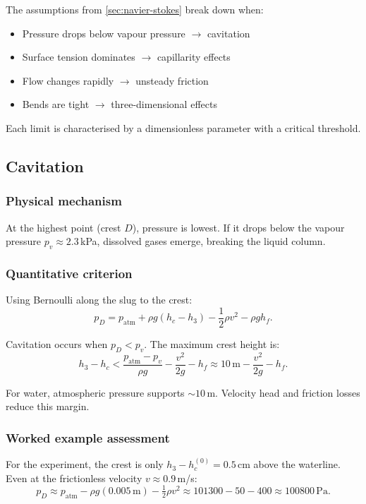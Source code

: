 \documentclass[11pt]{article}
\begin{document}
The assumptions from \cref{sec:navier-stokes} break down when:
\begin{itemize}[nosep,leftmargin=2em]
  \item Pressure drops below vapour pressure $\to$ cavitation
  \item Surface tension dominates $\to$ capillarity effects
  \item Flow changes rapidly $\to$ unsteady friction
  \item Bends are tight $\to$ three-dimensional effects
\end{itemize}

Each limit is characterised by a dimensionless parameter with a critical threshold.

\subsection{Cavitation}

\subsubsection{Physical mechanism}

At the highest point (crest $D$), pressure is lowest. If it drops below the vapour pressure $p_v \approx 2.3$\,kPa, dissolved gases emerge, breaking the liquid column.

\subsubsection{Quantitative criterion}

Using Bernoulli along the slug to the crest:
\[
  p_D = p_{\text{atm}} + \rho g(h_c - h_3) - \frac{1}{2}\rho v^2 - \rho g h_f.
\]

Cavitation occurs when $p_D < p_v$. The maximum crest height is:
\begin{equation}
  h_3 - h_c < \frac{p_{\text{atm}} - p_v}{\rho g} - \frac{v^2}{2g} - h_f \approx 10\,\text{m} - \frac{v^2}{2g} - h_f.
  \label{eq:cavitation-criterion}
\end{equation}

For water, atmospheric pressure supports $\sim 10$\,m. Velocity head and friction losses reduce this margin.

\subsubsection{Worked example assessment}

For the experiment, the crest is only $h_3 - h_c^{(0)} = 0.5$\,cm above the waterline. Even at the frictionless velocity $v \approx 0.9$\,m/s:
\[
  p_D \approx p_{\text{atm}} - \rho g (0.005\,\text{m}) - \tfrac{1}{2}\rho v^2 \approx 101300 - 50 - 400 \approx 100800\,\text{Pa}.
\]
\end{document}
